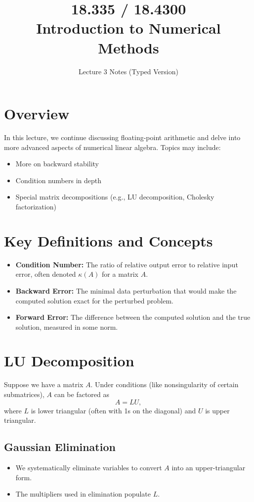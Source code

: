 \documentclass[12pt]{article}
\begin{document}
\title{18.335 / 18.4300 \\ Introduction to Numerical Methods}
\author{Lecture 3 Notes (Typed Version)}
\date{}
\maketitle

\section*{Overview}
In this lecture, we continue discussing floating-point arithmetic and delve into more advanced aspects of numerical linear algebra. Topics may include:
\begin{itemize}
    \item More on backward stability
    \item Condition numbers in depth
    \item Special matrix decompositions (e.g., LU decomposition, Cholesky factorization)
\end{itemize}

\section*{Key Definitions and Concepts}
\begin{itemize}
    \item \textbf{Condition Number:} The ratio of relative output error to relative input error, often denoted $\kappa(A)$ for a matrix $A$.
    \item \textbf{Backward Error:} The minimal data perturbation that would make the computed solution exact for the perturbed problem.
    \item \textbf{Forward Error:} The difference between the computed solution and the true solution, measured in some norm.
\end{itemize}

\section*{LU Decomposition}
Suppose we have a matrix $A$. Under conditions (like nonsingularity of certain submatrices), $A$ can be factored as 
\[
A = L U,
\]
where $L$ is lower triangular (often with 1s on the diagonal) and $U$ is upper triangular.

\subsection*{Gaussian Elimination}
\begin{itemize}
    \item We systematically eliminate variables to convert $A$ into an upper-triangular form.
    \item The multipliers used in elimination populate $L$.
\end{itemize}
\end{document}
